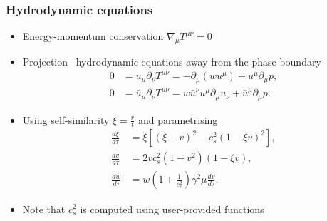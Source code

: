 \begin{frame}
    \frametitle{Hydrodynamic equations}
    \begin{itemize}
        \item Energy-momentum conservation $\nabla_\mu T^{\mu\nu} = 0$
        \item Projection \textrightarrow \ hydrodynamic equations away from the phase boundary
        \begin{align}
            0 &= u_\mu \partial_\nu T^{\mu \nu} = -\partial_\mu (w u^\mu) + u^\mu \partial_\mu p, \\
            0 &= \bar{u}_\mu \partial_\nu T^{\mu \nu} = w \bar{u}^\nu u^\mu \partial_\mu u_\nu + \bar{u}^\mu \partial_\mu p.
        \end{align}
        \item Using self-similarity $\xi = \frac{r}{t}$ and parametrising
        \begin{align}
            \frac{d\xi}{d\tau} &= \xi \left[ (\xi - v)^2 - c_s^2 (1 - \xi v)^2 \right], \\
            \frac{dv}{d\tau} &= 2 v c_s^2 (1 - v^2) (1 - \xi v), \\
            \frac{dw}{d\tau} &= w \left( 1 + \frac{1}{c_s^2} \right) \gamma^2 \mu \frac{dv}{d\tau}.
        \end{align}
        \item Note that $c_s^2$ is computed using user-provided functions
    \end{itemize}
\end{frame}

